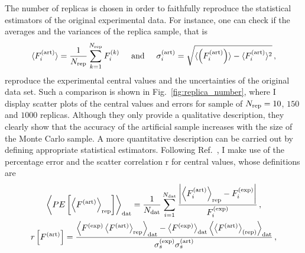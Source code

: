 %
%
The number of replicas is chosen in order to faithfully reproduce the statistical estimators of the original experimental data. For instance, one can check if the averages and the variances of the replica sample, that is
\begin{equation}
  \langle F_{i}^{\textrm{(art)}} \rangle = \frac{1}{N_{\textrm{rep}}} \sum_{k=1}^{N_{\textrm{rep}}} F_{i}^{(k)} \hspace{5mm} \textrm{and} \hspace*{5mm} \sigma_i^{\textrm{(art)}} = \sqrt{ \langle \left( F_{i}^{\textrm{(art)}} \right) \rangle - \langle F_{i}^{\textrm{(art)}} \rangle^2} \,,
\end{equation}
reproduce the experimental central values and the uncertainties of the original data set. Such a comparison is shown in Fig.~\ref{fig:replica_number}, where I display scatter plots of the central values and errors for sample of $N_{\textrm{rep}} = 10$, $150$ and $1000$ replicas. Although they only provide a qualitative description, they clearly show that the accuracy of the artificial sample increases with the size of the Monte Carlo sample. A more quantitative description can be carried out by defining appropriate statistical estimators. Following Ref.~\cite{DelDebbio:2004xtd}, I make use of the percentage error and the scatter correlation r for central values, whose definitions are
%
\begin{gather}
  \left< PE \left[ \left< F^{(\textrm{art})} \right>_{\textrm{rep}} \right] \right>_{\textrm{dat}} = \frac{1}{N_{\textrm{dat}}} \sum_{i=1}^{N_{\textrm{dat}}} \frac{\abs{\left< F_i^{\textrm{(art)}} \right>_{\textrm{rep}} - F_{i}^{\textrm{(exp)}}}}{F_i^{\textrm{(exp)}}}\,, \\
  r \left[ F^{\textrm{(art)}} \right] = \frac{\left< F^{\textrm{(exp)}} \left< F^{\textrm{(art)}} \right>_{\textrm{rep}} \right>_{\textrm{dat}} - \left< F^{\textrm{(exp)}} \right>_{\textrm{dat}} \left<  \left< F^{\textrm{(art)}} \right>_{\textrm{(rep)}}\right>_{\textrm{dat}} }{\sigma_s^{\textrm{(exp)}} \sigma_s^{\textrm{(art)}} }\,,
\end{gather}
